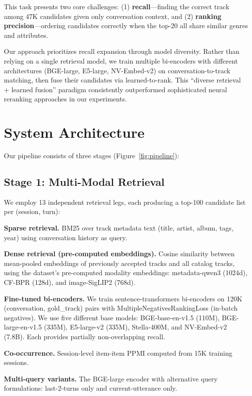 \documentclass[sigconf]{acmart}
\begin{document}
This task presents two core challenges: (1) \textbf{recall}---finding the correct track among 47K candidates given only conversation context, and (2) \textbf{ranking precision}---ordering candidates correctly when the top-20 all share similar genres and attributes.

Our approach prioritizes recall expansion through model diversity. Rather than relying on a single retrieval model, we train multiple bi-encoders with different architectures (BGE-large, E5-large, NV-Embed-v2) on conversation-to-track matching, then fuse their candidates via learned-to-rank. This ``diverse retrieval + learned fusion'' paradigm consistently outperformed sophisticated neural reranking approaches in our experiments.

\section{System Architecture}

Our pipeline consists of three stages (Figure~\ref{fig:pipeline}):



\subsection{Stage 1: Multi-Modal Retrieval}

We employ 13 independent retrieval legs, each producing a top-100 candidate list per (session, turn):

\textbf{Sparse retrieval.} BM25 over track metadata text (title, artist, album, tags, year) using conversation history as query.

\textbf{Dense retrieval (pre-computed embeddings).} Cosine similarity between mean-pooled embeddings of previously accepted tracks and all catalog tracks, using the dataset's pre-computed modality embeddings: metadata-qwen3 (1024d), CF-BPR (128d), and image-SigLIP2 (768d).

\textbf{Fine-tuned bi-encoders.} We train sentence-transformers bi-encoders on 120K (conversation, gold\_track) pairs with MultipleNegativesRankingLoss (in-batch negatives). We use five different base models: BGE-base-en-v1.5 (110M), BGE-large-en-v1.5 (335M), E5-large-v2 (335M), Stella-400M, and NV-Embed-v2 (7.8B). Each provides partially non-overlapping recall.

\textbf{Co-occurrence.} Session-level item-item PPMI computed from 15K training sessions.

\textbf{Multi-query variants.} The BGE-large encoder with alternative query formulations: last-2-turns only and current-utterance only.
\end{document}
